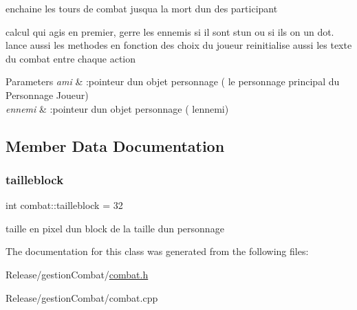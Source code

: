 enchaine les tours de combat jusqu\textquotesingle{}a la mort d\textquotesingle{}un des participant 

calcul qui agis en premier, gerre les ennemis si il sont stun ou si ils on un dot. lance aussi les methodes en fonction des choix du joueur reinitialise aussi les texte du combat entre chaque action


\begin{DoxyParams}{Parameters}
{\em ami} & \+:pointeur d\textquotesingle{}un objet personnage ( le personnage principal du Personnage Joueur) \\
\hline
{\em ennemi} & \+:pointeur d\textquotesingle{}un objet personnage ( l\textquotesingle{}ennemi) \\
\hline
\end{DoxyParams}


\subsection{Member Data Documentation}
\mbox{\label{classcombat_ac6d937b74a28b617bab6ed6bb7f581df}} 
\subsubsection{\texorpdfstring{tailleblock}{tailleblock}}
{\footnotesize\ttfamily int combat\+::tailleblock = 32}

taille en pixel d\textquotesingle{}un block de la taille d\textquotesingle{}un personnage 

The documentation for this class was generated from the following files\+:\begin{DoxyCompactItemize}
\item 
Release/gestion\+Combat/\mbox{\hyperlink{combat_8h}{combat.\+h}}\item 
Release/gestion\+Combat/combat.\+cpp\end{DoxyCompactItemize}
